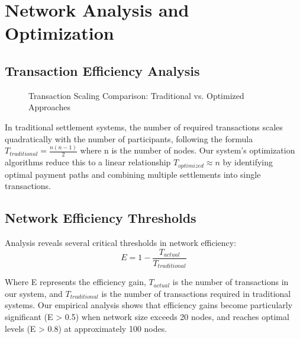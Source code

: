 \documentclass[twocolumn,10pt,a4paper]{article}
\begin{document}
\section{Network Analysis and Optimization}
\subsection{Transaction Efficiency Analysis}

\begin{figure}[h]
\centering
{}
\caption{Transaction Scaling Comparison: Traditional vs. Optimized Approaches}
\end{figure}

In traditional settlement systems, the number of required transactions scales quadratically with the number of participants, following the formula $T_{traditional} = \frac{n(n-1)}{2}$ where n is the number of nodes. Our system's optimization algorithms reduce this to a linear relationship $T_{optimized} \approx n$ by identifying optimal payment paths and combining multiple settlements into single transactions.

\subsection{Network Efficiency Thresholds}
Analysis reveals several critical thresholds in network efficiency:
\begin{equation}
E = 1 - \frac{T_{actual}}{T_{traditional}}
\end{equation}

Where E represents the efficiency gain, $T_{actual}$ is the number of transactions in our system, and $T_{traditional}$ is the number of transactions required in traditional systems. Our empirical analysis shows that efficiency gains become particularly significant (E > 0.5) when network size exceeds 20 nodes, and reaches optimal levels (E > 0.8) at approximately 100 nodes.
\end{document}
